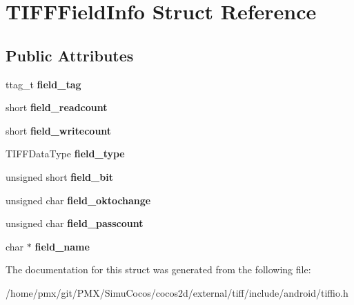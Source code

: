 \hypertarget{structTIFFFieldInfo}{}\section{T\+I\+F\+F\+Field\+Info Struct Reference}
\label{structTIFFFieldInfo}
\subsection*{Public Attributes}
\begin{DoxyCompactItemize}
\item 
\mbox{\label{structTIFFFieldInfo_a6eeb73c0bdb1f5df1a9c869848e9b339}} 
ttag\+\_\+t {\bfseries field\+\_\+tag}
\item 
\mbox{\label{structTIFFFieldInfo_a5c0c4c69fd4b9cb6760c93bd2fa057a3}} 
short {\bfseries field\+\_\+readcount}
\item 
\mbox{\label{structTIFFFieldInfo_ae6ad86c14c3db2a5afd9571b47531307}} 
short {\bfseries field\+\_\+writecount}
\item 
\mbox{\label{structTIFFFieldInfo_a91aba9220e3db23d0654e2f0fd35bc41}} 
T\+I\+F\+F\+Data\+Type {\bfseries field\+\_\+type}
\item 
\mbox{\label{structTIFFFieldInfo_a967ecfdbac32224d5142b727b0ed50af}} 
unsigned short {\bfseries field\+\_\+bit}
\item 
\mbox{\label{structTIFFFieldInfo_a5c4e1f027ab822f4c6b2883e89936c9d}} 
unsigned char {\bfseries field\+\_\+oktochange}
\item 
\mbox{\label{structTIFFFieldInfo_a49374744eb9a1ee467b418b714cedd5e}} 
unsigned char {\bfseries field\+\_\+passcount}
\item 
\mbox{\label{structTIFFFieldInfo_adaa7846e542ad2a67d92a6f2bce92435}} 
char $\ast$ {\bfseries field\+\_\+name}
\end{DoxyCompactItemize}


The documentation for this struct was generated from the following file\+:\begin{DoxyCompactItemize}
\item 
/home/pmx/git/\+P\+M\+X/\+Simu\+Cocos/cocos2d/external/tiff/include/android/tiffio.\+h\end{DoxyCompactItemize}
